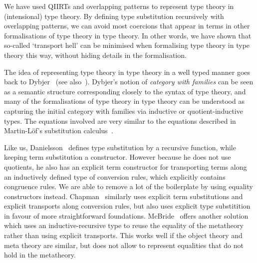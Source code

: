 \documentclass[a4paper,UKenglish,numberwithinsect,cleveref,thm-restate]{lipics-v2021}
\begin{document}
We have used QIIRTs and overlapping
patterns to represent type theory in (intensional) type theory. By defining type
substitution recursively with overlapping patterns, we can avoid most
coercions that appear in terms in other formalisations of type
theory in type theory. In other words, we have shown that so-called
`transport hell' can be minimised when formalising type theory in type
theory this way, without hiding details in the formalisation.


The idea of representing type theory in type theory in a well typed manner goes back to Dybjer~\cite{Dybjer1996} (see also~\cite{Clairambault2014,Castellan2021}). Dybjer's notion of \emph{category with families} can be seen as a semantic structure corresponding closely to the syntax of type theory, and many of the formalisations of type theory in type theory can be understood as capturing the initial category with families via inductive or quotient-inductive types. The equations involved are very similar to the equations described in Martin-L\"of's substitution calculus~\cite{Martin-Lof1992}.

Like us, Danielsson~\cite{Danielsson2006} defines type substitution by a recursive function, while keeping term substitution a constructor. However because he does not use quotients, he also has an explicit term constructor for transporting terms along an inductively defined type of conversion rules, which explicitly contains congruence rules. We are able to remove a lot of the boilerplate by using equality constructors instead. Chapman~\cite{Chapman2009} similarly uses explicit term substitutions and explicit transports along conversion rules, but also uses explicit type substitition in favour of more straightforward foundations.
McBride~\cite{McBride2010} offers another solution which uses an inductive-recursive type to reuse the equality of the metatheory rather than using explicit transports. This works well if the object theory and meta theory are similar, but does not allow to represent equalities that do not hold in the metatheory.
\end{document}
